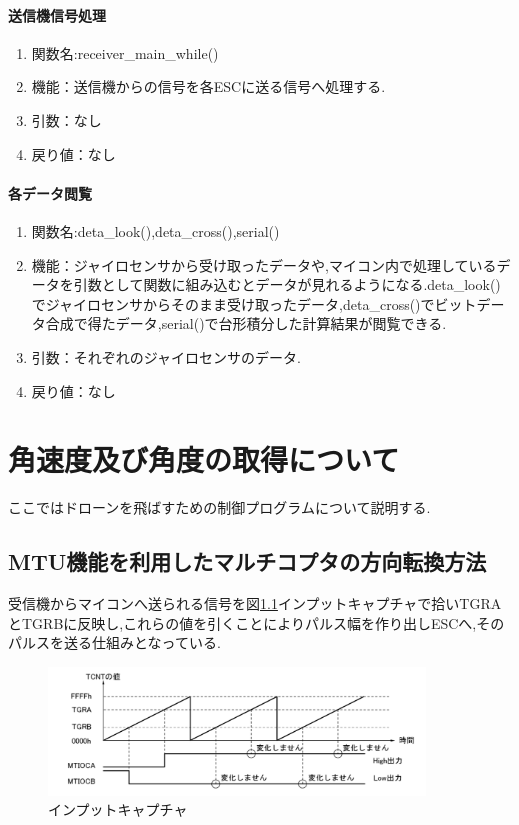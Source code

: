 \documentclass[12pt,oneside]{paper}
\begin{document}
\subsubsection{送信機信号処理}

\begin{enumerate}
\item 関数名:receiver\_main\_while()
\item 機能：送信機からの信号を各ESCに送る信号へ処理する.
\item 引数：なし
\item 戻り値：なし
\end{enumerate}

\subsubsection{各データ閲覧}
\begin{enumerate}
\item 関数名:deta\_look(),deta\_cross(),serial()
\item 機能：ジャイロセンサから受け取ったデータや,マイコン内で処理しているデータを引数として関数に組み込むとデータが見れるようになる.deta\_look()でジャイロセンサからそのまま受け取ったデータ,deta\_cross()でビットデータ合成で得たデータ,serial()で台形積分した計算結果が閲覧できる.
\item 引数：それぞれのジャイロセンサのデータ.
\item 戻り値：なし
\end{enumerate}


\chapter{角速度及び角度の取得について}ここではドローンを飛ばすための制御プログラムについて説明する.

\section{MTU機能を利用したマルチコプタの方向転換方法}
受信機からマイコンへ送られる信号を図\ref{fig:mtu}インプットキャプチャで拾いTGRAとTGRBに反映し,これらの値を引くことによりパルス幅を作り出しESCへ,そのパルスを送る仕組みとなっている.


\begin{figure}[H]
  \begin{center}
    \includegraphics[width=100mm]{ga/mtu.png}
    \end{center}
  \caption{インプットキャプチャ}
 \label{fig:mtu}
\end{figure}
\end{document}
